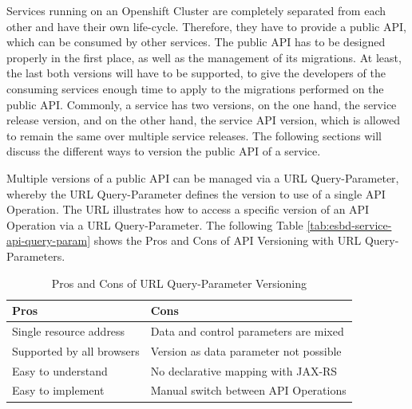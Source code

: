 Services running on an Openshift Cluster are completely separated from each other and have their own life-cycle. Therefore, they have to provide a public API, which can be consumed by other services. The public API has to be designed properly in the first place, as well as the management of its migrations. At least, the last both versions will have to be supported, to give the developers of the consuming services enough time to apply to the migrations performed on the public API. Commonly, a service has two versions, on the one hand, the service release version, and on the other hand, the service API version, which is allowed to remain the same over multiple service releases. The following sections will discuss the different ways to version the public API of a service.

Multiple versions of a public API can be managed via a URL Query-Parameter, whereby the URL Query-Parameter defines the version to use of a single API Operation. The URL  illustrates how to access a specific version of an API Operation via a URL Query-Parameter. The following Table \vref{tab:esbd-service-api-query-param} shows the Pros and Cons of API Versioning with URL Query-Parameters.

{\renewcommand{\arraystretch}{1.2}%
	\begin{table}[h]
		\begin{tabularx}{\textwidth}{ X|X }	
			\textbf{Pros}                 & \textbf{Cons}    \\  \hline
			Single resource address       & Data and control parameters are mixed  \\  
			Supported by all browsers     & Version as data parameter not possible \\
			Easy to understand            & No declarative mapping with JAX-RS     \\
			Easy to implement             & Manual switch between API Operations   \\ \hline
		\end{tabularx}
		\caption{Pros and Cons of URL Query-Parameter Versioning}
		\label{tab:esbd-service-api-query-param}
\end{table}}

